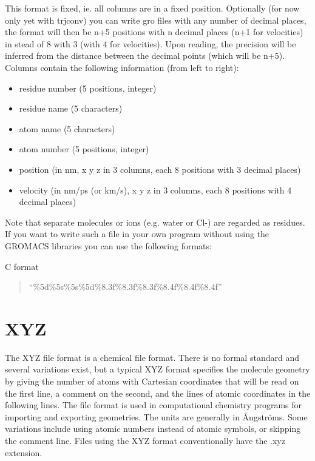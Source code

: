 \documentclass[letterpaper,10pt,english]{sphinxmanual}
\begin{document}
This format is fixed, ie. all columns are in a fixed position. Optionally (for now only
yet with trjconv) you can write gro files with any number of decimal places, the format
will then be n+5 positions with n decimal places (n+1 for velocities) in stead of 8 with
3 (with 4 for velocities). Upon reading, the precision will be inferred from the distance
between the decimal points (which will be n+5). Columns contain the following information
(from left to right):
\begin{itemize}
\item {} 
residue number (5 positions, integer)

\item {} 
residue name (5 characters)

\item {} 
atom name (5 characters)

\item {} 
atom number (5 positions, integer)

\item {} 
position (in nm, x y z in 3 columns, each 8 positions with 3 decimal places)

\item {} 
velocity (in nm/ps (or km/s), x y z in 3 columns, each 8 positions with 4 decimal places)

\end{itemize}

Note that separate molecules or ions (e.g. water or Cl-) are regarded as residues. If you want
to write such a file in your own program without using the GROMACS libraries you can use the
following formats:

C format
\begin{quote}

``\%5d\%5s\%5s\%5d\%8.3f\%8.3f\%8.3f\%8.4f\%8.4f\%8.4f''
\end{quote}


\section{XYZ}
\label{documentation_pages/file_format:xyz}
The XYZ file format is a chemical file format. There is no formal standard and several
variations exist, but a typical XYZ format specifies the molecule geometry by giving the
number of atoms with Cartesian coordinates that will be read on the first line, a comment
on the second, and the lines of atomic coordinates in the following lines. The file format
is used in computational chemistry programs for importing and exporting geometries. The
units are generally in Ångströms. Some variations include using atomic numbers instead of
atomic symbols, or skipping the comment line. Files using the XYZ format conventionally
have the .xyz extension.
\end{document}
